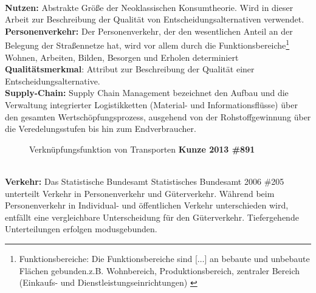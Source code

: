 \begin{figure}[htbp]
  \centering
  \caption{}
  \label{}
\end{figure}
~\\
\textbf{Nutzen}\textbf{: }Abstrakte Größe der Neoklassischen Konsumtheorie. Wird in dieser Arbeit zur Beschreibung der Qualität von Entscheidungsalternativen verwendet.~\\
\textbf{Personenverkehr}\textbf{:}\textbf{ }\glqq Der Personenverkehr, der den wesentlichen Anteil an der Belegung der Straßennetze hat, wird vor allem durch die Funktionsbereiche\footnote{%
 Funktionsbereiche: \glqq Die Funktionsbereiche sind [$\ldots$] an bebaute und unbebaute Flächen gebunden.\grqq  z.B. Wohnbereich, Produktionsbereich, zentraler Bereich (Einkaufs- und Dienstleistungseinrichtungen)  \autocites[][]{bib.213}
}%
 Wohnen, Arbeiten, Bilden, Besorgen und Erholen determiniert\grqq   \autocites[][]{bib.213}~\\
\textbf{Qualitätsmerkmal}: Attribut zur Beschreibung der Qualität einer Entscheidungsalternative.~\\
\textbf{Supply}\textbf{-Chain}\textbf{: }\textbf{\glqq }Supply Chain Management bezeichnet den Aufbau und die Verwaltung integrierter Logistikketten (Material- und Informationsflüsse) über den gesamten Wertschöpfungsprozess, ausgehend von der Rohstoffgewinnung über die Veredelungsstufen bis hin zum Endverbraucher.~\\

\begin{figure}[htbp]
  \centering
  \caption{ Verknüpfungsfunktion von Transporten \textbf{{Kunze 2013 \#891}}}
  \label{_Ref366580354}
\end{figure}
~\\
\textbf{Verkehr}\textbf{:}\textbf{ }Das Statistische Bundesamt {Statistisches Bundesamt 2006 \#205} unterteilt Verkehr in Personenverkehr und Güterverkehr. Während beim Personenverkehr in Individual- und öffentlichen Verkehr unterschieden wird, entfällt eine vergleichbare Unterscheidung für den Güterverkehr. Tiefergehende Unterteilungen erfolgen modusgebunden. ~\\

